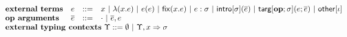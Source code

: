 $\begin{array}{llclr}%
\textbf{external terms} & e & ::= & \multicolumn{2}{l}{x ~|~ \eanalam{x}{e} ~|~ \eap{e}{e} ~|~ \efix{x}{e} ~|~ \easc{e}{\st} ~|~ \eintro{\st}{\es} ~|~ \etarg{\opname{op}}{\st}{e}{\es} ~|~ \eother{\iota}}\\
\textbf{op arguments}&\es & ::= & \cdot ~|~ \es, e\\
\multicolumn{4}{l}{\textbf{external typing contexts}~\Upsilon ::=  \emptyset ~|~ \Upsilon, x \Rightarrow \st} & \\
\end{array}%
$